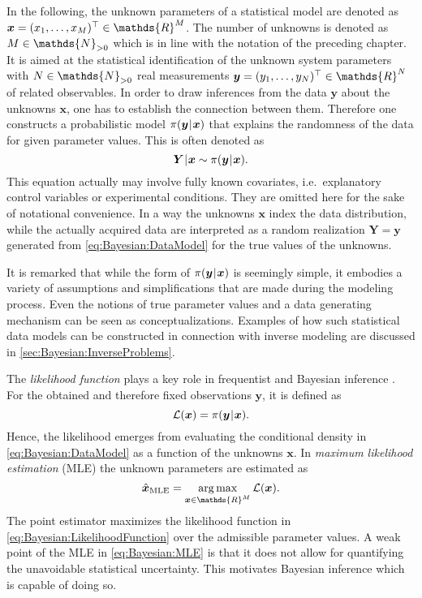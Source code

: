 In the following, the unknown parameters of a statistical model are denoted as \(\bm{x} = (x_1,\ldots,x_\dimParam)^\top \in \mathds{R}^\dimParam\).
The number of unknowns is denoted as \(\dimParam \in \mathds{N}_{>0}\) which is in line with the notation of the preceding chapter.
It is aimed at the statistical identification of the unknown system parameters with \(\dimData \in \mathds{N}_{>0}\) real measurements
\(\bm{y} = (y_1,\ldots,y_\dimData)^\top \in \mathds{R}^\dimData\) of related observables.
In order to draw inferences from the data \(\bm{y}\) about the unknowns \(\bm{x}\), one has to establish the connection between them.
Therefore one constructs a probabilistic model \(\pi(\bm{y} {\:\!}|{\:\!} \bm{x})\) that explains the randomness of the data for given parameter values.
This is often denoted as
\begin{equation} \label{eq:Bayesian:DataModel}
  \bm{Y} {\:\!}|{\:\!} \bm{x} \sim \pi(\bm{y} {\:\!}|{\:\!} \bm{x}).
\end{equation}
This equation actually may involve fully known covariates, i.e.\ explanatory control variables or experimental conditions.
They are omitted here for the sake of notational convenience.
In a way the unknowns \(\bm{x}\) index the data distribution, while the actually acquired data are interpreted
as a random realization \(\bm{Y} = \bm{y}\) generated from \cref{eq:Bayesian:DataModel} for the true values of the unknowns.
\par %
It is remarked that while the form of \(\pi(\bm{y} {\:\!}|{\:\!} \bm{x})\) is seemingly simple,
it embodies a variety of assumptions and simplifications that are made during the modeling process.
Even the notions of true parameter values and a data generating mechanism can be seen as conceptualizations.
Examples of how such statistical data models can be constructed in connection with inverse modeling are discussed in \cref{sec:Bayesian:InverseProblems}.
\par %
The \emph{likelihood function} plays a key role in frequentist and Bayesian inference \cite{Statistics:Pawitan2001,Statistics:Rohde2014}.
For the obtained and therefore fixed observations \(\bm{y}\), it is defined as
\begin{equation} \label{eq:Bayesian:LikelihoodFunction}
  \mathcal{L}(\bm{x}) = \pi(\bm{y} {\:\!}|{\:\!} \bm{x}).
\end{equation}
Hence, the likelihood emerges from evaluating the conditional density in \cref{eq:Bayesian:DataModel} as a function of the unknowns \(\bm{x}\).
In \emph{maximum likelihood estimation} (MLE) the unknown parameters are estimated as
\begin{equation} \label{eq:Bayesian:MLE}
  \hat{\bm{x}}_{\mathrm{MLE}} = \operatorname*{arg\,max}_{\bm{x} \in \mathds{R}^\dimParam} \mathcal{L}(\bm{x}).
\end{equation}
The point estimator maximizes the likelihood function in \cref{eq:Bayesian:LikelihoodFunction} over the admissible parameter values.
A weak point of the MLE in \cref{eq:Bayesian:MLE} is that it does not allow for quantifying the unavoidable statistical uncertainty.
This motivates Bayesian inference which is capable of doing so.